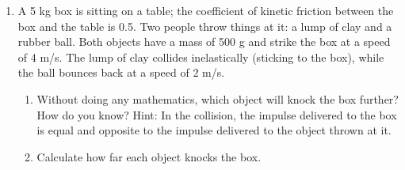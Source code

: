 \documentclass[12pt]{article}
\begin{document}
\begin{enumerate}
\begin{enumerate}
{			\vspace{4in}
			
		\end{enumerate}
		
		\newpage
		
		
		\item{A 5 kg box is sitting on a table; the coefficient of kinetic friction between the box and the table is 0.5.
			Two people throw things at it: a lump of clay and a rubber ball. Both objects have a mass of 500 g and strike the box at a speed of 4 m/s. The lump of clay collides inelastically (sticking to the box), while the ball bounces back at a speed of 2 m/s.}
		\begin{enumerate}
			\item{Without doing any mathematics, which object will knock the box further? How do you know? Hint: In the collision, the impulse delivered to the box is equal and opposite to the impulse delivered to the object thrown at it.}
			\vspace{2in}
			\item{Calculate how far each object knocks the box.}
		\end{enumerate}
	\end{enumerate}
	
\end{document}
